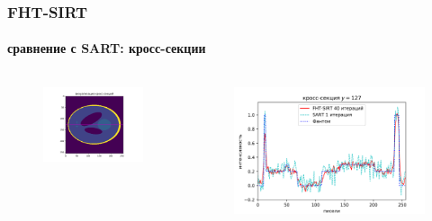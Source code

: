 \documentclass[12pt]{beamer}
\begin{document}
\begin{frame}
\frametitle{FHT-SIRT}
\framesubtitle{сравнение с SART: кросс-секции}
\begin{columns}[T,onlytextwidth]
  \hspace*{-1cm}
  \begin{column}{0.2\textwidth}
    \begin{figure}
      \centering
      \vspace{1.5cm}
      \includegraphics[width=1.5\textwidth]{cs_127_viz}
    \end{figure}
  \end{column}
  \begin{column}{0.8\textwidth}
    \begin{figure}
      \centering
      \vspace{-1cm}
      \includegraphics[width=1.2\textwidth]{cs_127}
    \end{figure}
  \end{column}
\end{columns}
\end{frame}
\end{document}
